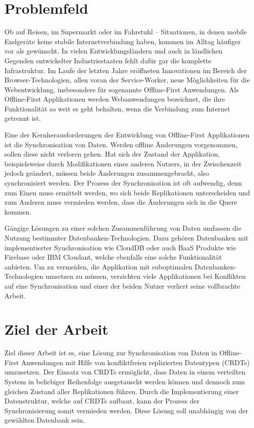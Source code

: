 \documentclass[a4paper, 12pt]{scrreprt}
\begin{document}
\section{Problemfeld}\label{sec:Problemfeld}

Ob auf Reisen, im Supermarkt oder im Fahrstuhl -- Situationen, in denen mobile Endgeräte keine stabile Internetverbindung haben, kommen im Alltag häufiger vor als gewünscht. In vielen Entwicklungsländern und auch in ländlichen Gegenden entwickelter Industriestaaten fehlt dafür gar die komplette Infrastruktur. Im Laufe der letzten Jahre eröffneten Innovationen im Bereich der Browser-Technologien, allen voran der Service-Worker, neue Möglichkeiten für die Webentwicklung, insbesondere für sogenannte Offline-First Anwendungen. Als Offline-First Applikationen werden Webanwendungen bezeichnet, die ihre Funktionalität so weit es geht behalten, wenn die Verbindung zum Internet getrennt ist.

Eine der Kernherausforderungen der Entwicklung von Offline-First Applikationen ist die Synchronisation von Daten. Werden offline Änderungen vorgenommen, sollen diese nicht verloren gehen. Hat sich der Zustand der Applikation, beispielsweise durch Modifikationen eines anderen Nutzers, in der Zwischenzeit jedoch geändert, müssen beide Änderungen zusammengebracht, also synchronisiert werden. Der Prozess der Synchronisation ist oft aufwendig, denn zum Einen muss ermittelt werden, wo sich beide Replikationen unterscheiden und zum Anderen muss vermieden werden, dass die Änderungen sich in die Quere kommen. 

Gängige Lösungen zu einer solchen Zusammenführung von Daten umfassen die Nutzung bestimmter Datenbanken-Technologien. Dazu gehören Datenbanken mit implementierter Synchronisation wie CloudDB oder auch \ac{BaaS} Produkte wie Firebase oder IBM Cloudant, welche ebenfalls eine solche Funktionalität anbieten. Um zu vermeiden, die Applikation mit suboptimalen Datenbanken-Technologien umsetzen zu müssen, verzichten viele Applikationen bei Konflikten auf eine Synchronisation und einer der beiden Nutzer verliert seine vollbrachte Arbeit.

\section{Ziel der Arbeit} 

Ziel dieser Arbeit ist es, eine Lösung zur Synchronisation von Daten in Offline-First Anwendungen mit Hilfe von konfliktfreien replizierten Datentypen (\acp{CRDT}) umzusetzen. Der Einsatz von \acp{CRDT} ermöglicht, dass Daten in einem verteilten System in beliebiger Reihenfolge ausgetauscht werden können und dennoch zum gleichen Zustand aller Replikationen führen. Durch die Implementierung einer Datenstruktur, welche auf \acp{CRDT} aufbaut, kann der Prozess der Synchronisierung somit vermieden werden. Diese Lösung soll unabhängig von der gewählten Datenbank sein.
\end{document}
